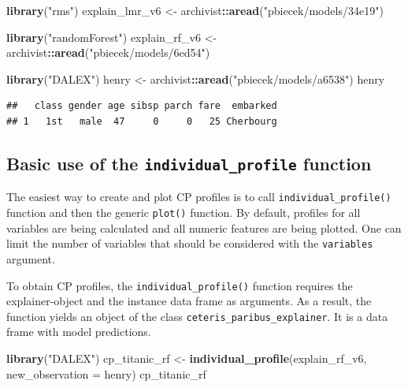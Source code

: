 \documentclass[]{krantz}
\newenvironment{Shaded}{\begin{snugshade}}{\end{snugshade}}
\newcommand{\DataTypeTok}[1]{\textcolor[rgb]{0.13,0.29,0.53}{#1}}
\newcommand{\KeywordTok}[1]{\textcolor[rgb]{0.13,0.29,0.53}{\textbf{#1}}}
\newcommand{\NormalTok}[1]{#1}
\newcommand{\OperatorTok}[1]{\textcolor[rgb]{0.81,0.36,0.00}{\textbf{#1}}}
\newcommand{\StringTok}[1]{\textcolor[rgb]{0.31,0.60,0.02}{#1}}
\begin{document}
\begin{Shaded}
\begin{Highlighting}[]
\KeywordTok{library}\NormalTok{(}\StringTok{"rms"}\NormalTok{)}
\NormalTok{explain_lmr_v6 <-}\StringTok{ }\NormalTok{archivist}\OperatorTok{::}\KeywordTok{aread}\NormalTok{(}\StringTok{"pbiecek/models/34e19"}\NormalTok{)}

\KeywordTok{library}\NormalTok{(}\StringTok{"randomForest"}\NormalTok{)}
\NormalTok{explain_rf_v6 <-}\StringTok{ }\NormalTok{archivist}\OperatorTok{::}\KeywordTok{aread}\NormalTok{(}\StringTok{"pbiecek/models/6ed54"}\NormalTok{)}

\KeywordTok{library}\NormalTok{(}\StringTok{"DALEX"}\NormalTok{)}
\NormalTok{henry <-}\StringTok{ }\NormalTok{archivist}\OperatorTok{::}\KeywordTok{aread}\NormalTok{(}\StringTok{"pbiecek/models/a6538"}\NormalTok{)}
\NormalTok{henry}
\end{Highlighting}
\end{Shaded}

\begin{verbatim}
##   class gender age sibsp parch fare  embarked
## 1   1st   male  47     0     0   25 Cherbourg
\end{verbatim}

\hypertarget{basic-use-of-the-individual_profile-function}{%
\subsection{\texorpdfstring{Basic use of the \texttt{individual\_profile} function}{Basic use of the individual\_profile function}}\label{basic-use-of-the-individual_profile-function}}

The easiest way to create and plot CP profiles is to call \texttt{individual\_profile()} function and then the generic \texttt{plot()} function. By default, profiles for all variables are being calculated and all numeric features are being plotted. One can limit the number of variables that should be considered with the \texttt{variables} argument.

To obtain CP profiles, the \texttt{individual\_profile()} function requires the explainer-object and the instance data frame as arguments. As a result, the function yields an object of the class \texttt{ceteris\_paribus\_explainer}. It is a data frame with model predictions.

\begin{Shaded}
\begin{Highlighting}[]
\KeywordTok{library}\NormalTok{(}\StringTok{"DALEX"}\NormalTok{)}
\NormalTok{cp_titanic_rf <-}\StringTok{ }\KeywordTok{individual_profile}\NormalTok{(explain_rf_v6, }
                                    \DataTypeTok{new_observation =}\NormalTok{ henry)}
\NormalTok{cp_titanic_rf}
\end{Highlighting}
\end{Shaded}
\end{document}
